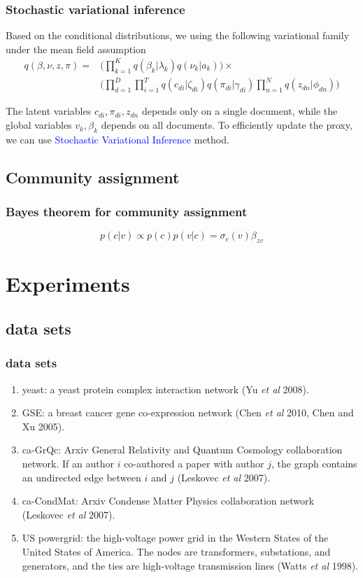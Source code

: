 \documentclass{beamer}
\begin{document}
\begin{frame}
\frametitle{Stochastic variational inference}
Based on the conditional distributions, we using the following variational family under the mean field assumption
\begin{align*}
q(\beta,\nu,z,\pi)  = & \Big(\prod_{k=1}^{K}q(\beta_k|\lambda_k)q(\nu_k|a_k)\Big)\times\\
&\Big(\prod_{d=1}^{D}\prod_{i=1}^{T}q(c_{di}|\zeta_{di})q(\pi_{di}|\gamma_{di})\prod_{n=1}^{N}q(z_{dn}|\phi_{dn})\Big)
\end{align*}

The latent variables $c_{di}, \pi_{di}, z_{dn}$ depends only on a single document, while the global variables $v_k, \beta_k$ depends on all documents. To efficiently update the proxy, we can use \textcolor{blue}{Stochastic Variational Inference} method.
\end{frame}

\subsection{Community assignment}
\begin{frame}
\frametitle{Bayes theorem for community assignment}
$$
p(c|v) \propto p(c)p(v|c) = \sigma_c(v)\beta_{zv}
$$
\end{frame}

\section{Experiments}
\subsection{data sets}
\begin{frame}
\frametitle{data sets}
\begin{enumerate}
	\item yeast: a yeast protein complex interaction network (Yu \textit{et al} 2008).
	\item GSE: a breast cancer gene co-expression network (Chen \textit{et al} 2010, Chen and Xu 2005).
	\item ca-GrQc: Arxiv General Relativity and Quantum Cosmology collaboration network. If an author $i$ co-authored a paper with author $j$, the graph contains an undirected edge between $i$ and $j$ (Leskovec \textit{et al} 2007).
	\item ca-CondMat: Arxiv Condense Matter Physics collaboration network (Leskovec \textit{et al} 2007).
	\item US powergrid: the high-voltage power grid in the Western States of the United States of America. The nodes are transformers, substations, and generators, and the ties are high-voltage transmission lines (Watts \textit{et al} 1998).
\end{enumerate}
\end{frame}
\end{document}
